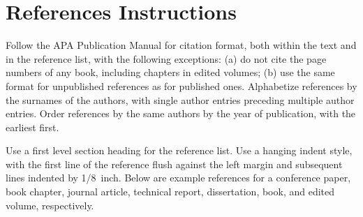 \documentclass[10pt,letterpaper]{article}
\begin{document}
\section{References Instructions}

Follow the APA Publication Manual for citation format, both within the
text and in the reference list, with the following exceptions: (a) do
not cite the page numbers of any book, including chapters in edited
volumes; (b) use the same format for unpublished references as for
published ones. Alphabetize references by the surnames of the authors,
with single author entries preceding multiple author entries. Order
references by the same authors by the year of publication, with the
earliest first.

Use a first level section heading for the reference list. Use a
hanging indent style, with the first line of the reference flush
against the left margin and subsequent lines indented by 1/8~inch.
Below are example references for a conference paper, book chapter,
journal article, technical report, dissertation, book, and edited
volume, respectively.

\nocite{ChalnickBillman1988a}
\nocite{Feigenbaum1963a}
\nocite{Hill1983a}
\nocite{OhlssonLangley1985a}
\nocite{Lewis1978a}
\nocite{NewellSimon1972a}
\nocite{ShragerLangley1990a}




\setlength{\bibleftmargin}{.125in}
\setlength{\bibindent}{-\bibleftmargin}


\end{document}
